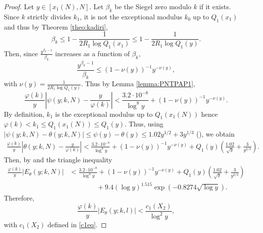 \documentclass[12pt]{amsart}
\begin{document}
\begin{proof}
Let $y\in[x_1(N),N]$. Let $\beta_k$ be the Siegel zero modulo $k$ if it exists. Since $k$ strictly divides $k_1$, it is not the exceptional modulus $k_0$ up to $Q_1(x_1)$ and thus by Theorem \ref{theo:kadiri},
\begin{equation} \label{eq: beta-bound}
    \beta_k \le 1 - \frac{1}{2 R_1 \log Q_1(x_1)}\le 1-\frac{1}{2R_1\log Q_1(y)}.
\end{equation}
Then, since $\frac{y^{\beta_k - 1}}{\beta_k}$ increases as a function of $\beta_k$,
$$\frac{y^{\beta_k - 1}}{\beta_k} \le (1 - \nu(y))^{-1} y^{-\nu(y)},$$
with $\nu(y)=\frac{1}{2 R_1 \log Q_1(y)}$. Thus by Lemma \ref{lemma:PNTPAP1},
$$\frac{\varphi(k)}{y} \left| \psi(y; k, N) - \frac{y}{\varphi(k)} \right| < \frac{3.2 \cdot 10^{-8}}{\log^{8} y} + (1-\nu(y))^{-1} y^{- \nu(y)}.$$
By definition, $k_1$ is the exceptional modulus up to $Q_1(x_1(N))$ hence $\varphi(k) < k_1 \le Q_1(x_1(N)) \le Q_1(y)$. Thus, using $|\psi(y; k,N) - \theta(y; k,N)| \le \psi(y)-\theta(y)\le 1.02y^{1/2}+3y^{1/3}$ (\cite[(3.39)]{R-S}), we obtain
\begin{align*}
    \frac{\varphi(k)}{y} \left| \theta(y; k, N) - \frac{y}{\varphi(k)} \right| < \frac{3.2\cdot 10^{-8}}{\log^{8} y} + (1 - \nu(y))^{-1} y^{ - \nu(y)}
    + Q_1(y)\left(\frac{1.02}{\sqrt{y}}+\frac{3}{y^{2/3}}\right).
\end{align*}
Then, by \cite[Corollary 1.2 \& Table 1, l.1]{JohnstonYang} and the triangle inequality
\begin{align*}
    \frac{\varphi(k)}{y} \left| E_{\theta}(y; k,N) \right| &< \frac{3.2\cdot 10^{-8}}{\log^{8} y} + (1 - \nu(y))^{-1} y^{ - \nu(y)}
    + Q_1(y)\left(\frac{1.02}{\sqrt{y}}+\frac{3}{y^{2/3}}\right) \\
    &\qquad\qquad + 9.4(\log y)^{1.515}\exp(-0.8274\sqrt{\log y}).
\end{align*}
Therefore, $$\frac{\varphi(k)}{y} \left| E_{\theta}(y; k,l) \right| < \frac{c_1(X_2)}{\log^2 y},$$
with $c_1(X_2)$ defined in \eqref{c1eq}.


\end{proof}
\end{document}
